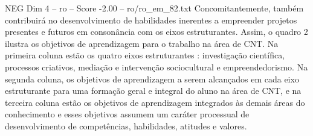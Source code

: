 \begin{textsample}{NEG Dim 4 – ro – Score -2.00 – ro/ro\_em\_82.txt}
Concomitantemente, também contribuirá no desenvolvimento de habilidades inerentes a empreender projetos presentes e futuros em consonância com os eixos estruturantes.
Assim, o quadro 2 ilustra os objetivos de aprendizagem para o trabalho na área de CNT.
Na primeira coluna estão os quatro eixos estruturantes : investigação científica, processos criativos, mediação e intervenção sociocultural e empreendedorismo.
Na segunda coluna, os objetivos de aprendizagem a serem alcançados em cada eixo estruturante para uma formação geral e integral do aluno na área de CNT, e na terceira coluna estão os objetivos de aprendizagem integrados às demais áreas do conhecimento e esses objetivos assumem um caráter processual de desenvolvimento de competências, habilidades, atitudes e valores.

\end{textsample}
